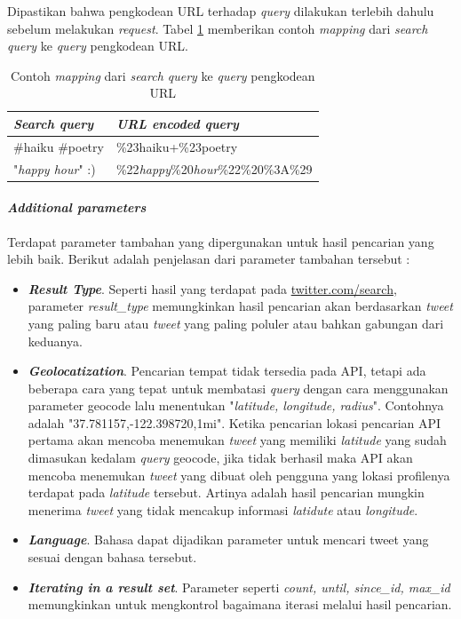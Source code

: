 Dipastikan bahwa pengkodean URL terhadap \textit{query} dilakukan terlebih dahulu sebelum melakukan \textit{request}. Tabel \ref{tab:ContohMappingDariSeachQuery} memberikan contoh \textit{mapping} dari \textit{search query} ke \textit{query} pengkodean URL.

\begin{table}[h]
\begin{tabular}{|l|l|}
\hline
\textbf{\textit{Search query}}     & \textbf{\textit{URL encoded query}}                 \\ \hline
\#haiku \#poetry & \%23haiku+\%23poetry              \\
"\textit{happy hour}" :)  & \%22\textit{happy}\%20\textit{hour}\%22\%20\%3A\%29 \\ \hline
\end{tabular}
\caption{Contoh \textit{mapping} dari \textit{search query} ke \textit{query} pengkodean URL}
\label{tab:ContohMappingDariSeachQuery}
\end{table}

\paragraph{\textit{Additional parameters}}
Terdapat parameter tambahan yang dipergunakan untuk hasil pencarian yang lebih baik. Berikut adalah penjelasan dari parameter tambahan tersebut :

\begin{itemize}
	\item \textbf{\textit{Result Type}}. Seperti hasil yang terdapat pada \url{twitter.com/search}, parameter \textit{result\_type} memungkinkan hasil pencarian akan berdasarkan \textit{tweet} yang paling baru atau \textit{tweet} yang paling poluler atau bahkan gabungan dari keduanya.
	\item \textit{\textbf{Geolocatization}}. Pencarian tempat tidak tersedia pada API, tetapi ada beberapa cara yang tepat untuk membatasi \textit{query} dengan cara menggunakan parameter geocode lalu menentukan "\textit{latitude, longitude, radius}". Contohnya adalah "37.781157,-122.398720,1mi". Ketika pencarian lokasi pencarian API pertama akan mencoba menemukan \textit{tweet} yang memiliki \textit{latitude} yang sudah dimasukan kedalam \textit{query} geocode, jika tidak berhasil maka API akan mencoba menemukan \textit{tweet} yang dibuat oleh pengguna yang lokasi profilenya terdapat pada \textit{latitude} tersebut. Artinya adalah hasil pencarian mungkin menerima \textit{tweet} yang tidak mencakup informasi \textit{latidute} atau \textit{longitude}.
	\item \textit{\textbf{Language}}. Bahasa dapat dijadikan parameter untuk mencari tweet yang sesuai dengan bahasa tersebut.
	\item \textbf{\textit{Iterating in a result set}}. Parameter seperti \textit{count, until, since\_id, max\_id} memungkinkan untuk mengkontrol bagaimana iterasi melalui hasil pencarian.
\end{itemize}

